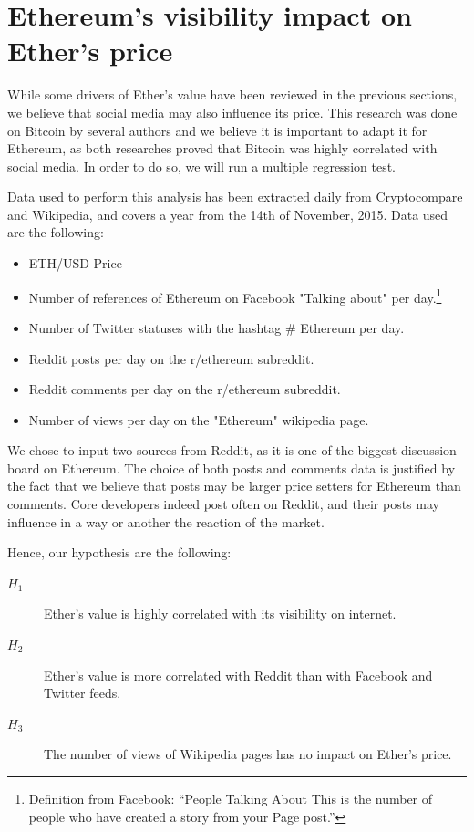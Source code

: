 \documentclass[11pt]{report}
\begin{document}
 \section{Ethereum's visibility impact on Ether's price}

 While some drivers of Ether's value have been reviewed in the previous sections, we believe that social media may also influence its price. This research was done on Bitcoin by several authors \cite{SENTIMENT} \cite{BIGCOIN} and we believe it is important to adapt it for Ethereum, as both researches proved that Bitcoin was highly correlated with social media. In order to do so, we will run a multiple regression test.\newline
 
 Data used to perform this analysis has been extracted daily from Cryptocompare\cite{CRYPTOCOMPARE} and Wikipedia, and covers a year from the 14th of November, 2015. Data used are the following: \begin{itemize}
 \item ETH/USD Price
 \item Number of references of Ethereum on Facebook "Talking about" per day.\footnote{Definition from Facebook: “People Talking About This is the number of people who have created a story from your Page post.”}
 \item Number of Twitter statuses with the hashtag \# Ethereum per day.
 \item Reddit posts per day on the r/ethereum subreddit.
 \item Reddit comments per day on the r/ethereum subreddit.
 \item Number of views per day on the "Ethereum" wikipedia page.
 \end{itemize}
 
We chose to input two sources from Reddit, as it is one of the biggest discussion board on Ethereum. The choice of both posts and comments data is justified by the fact that we believe that posts may be larger price setters for Ethereum than comments. Core developers indeed post often on Reddit, and their posts may influence in a way or another the reaction of the market.\newline 
 
Hence, our hypothesis are the following:
 \begin{description}
\item[$H_1$] Ether's value is highly correlated with its visibility on internet.
\item[$H_2$] Ether's value is more correlated with Reddit than with Facebook and Twitter feeds.
\item[$H_3$]The number of views of Wikipedia pages has no impact on Ether's price.
\end{description}
\clearpage
\end{document}
